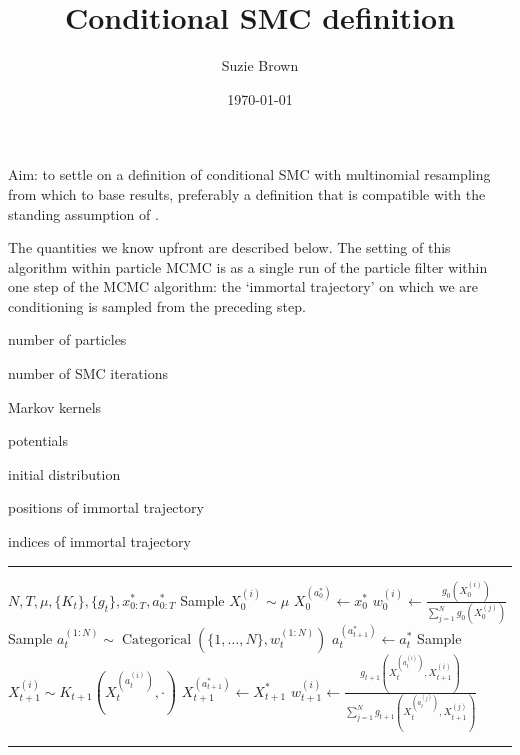 \documentclass[fleqn]{article}
\title{Conditional SMC definition}
\author{Suzie Brown}
\date{\today}
\newcommand{\Cat}{\operatorname{Categorical}}
\begin{document}
\maketitle

Aim: to settle on a definition of conditional SMC with multinomial resampling from which to base results, preferably a definition that is compatible with the standing assumption of \citet{koskela2018}.

The quantities we know upfront are described below. The setting of this algorithm within particle MCMC \citep{andrieu2010} is as a single run of the particle filter within one step of the MCMC algorithm: the `immortal trajectory' on which we are conditioning is sampled from the preceding step.

\begin{description}[style=multiline,leftmargin=2.5cm]
\item [$N$] number of particles
\item [$T$] number of SMC iterations
\item [$\{K_t\}_{t=1,\dots,T}$] Markov kernels
\item [$\{g_t\}_{t=0,\dots,T}$] potentials
\item [$\mu$] initial distribution
\item [$x_{0:T}^*$] positions of immortal trajectory
\item [$a_{0:T}^*$] indices of immortal trajectory
\end{description}

\hrule
\begin{algorithmic}[1]
\Require $N, T, \mu, \{K_t\}, \{g_t\}, x_{0:T}^*, a_{0:T}^*$
	\State Sample $X_0^{(i)} \sim \mu$ 
\EndFor
\State $X_0^{(a_0^*)} \gets x_0^*$
	\State $w_0^{(i)} \gets \frac{g_0(X_0^{(i)})}{\sum_{j=1}^N g_0(X_0^{(j)})}$
\EndFor
{}
	\State Sample $a_t^{(1:N)} \sim \Cat(\{1,\dots,N\}, w_t^{(1:N)})$
	\State $a_t^{(a_{t+1}^*)} \gets a_t^*$
		\State Sample $X_{t+1}^{(i)} \sim K_{t+1}(X_t^{(a_t^{(i)})}, \cdot)$
	\EndFor
	\State $X_{t+1}^{(a_{t+1}^*)} \gets X_{t+1}^*$
		\State $w_{t+1}^{(i)} \gets \frac{g_{t+1}(X_t^{(a_t^{(i)})} , X_{t+1}^{(i)})}{\sum_{j=1}^N g_{t+1}(X_t^{(a_t^{(j)})} , X_{t+1}^{(j)})}$
	\EndFor
\EndFor
\end{algorithmic}
\hrule
\end{document}
